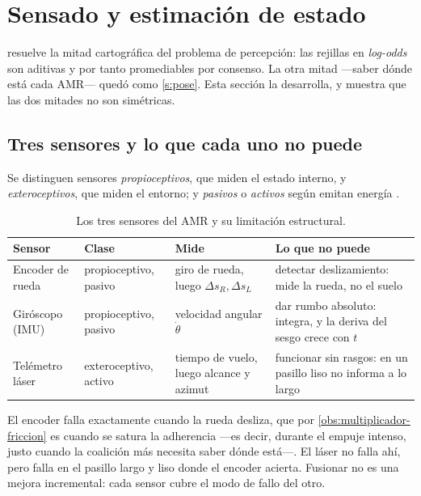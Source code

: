 \section{Sensado y estimación de estado}
\label{sec:estimacion}

 resuelve la mitad cartográfica del problema de percepción: las
rejillas en \emph{log-odds} son aditivas y por tanto promediables por consenso.
La otra mitad —saber dónde está cada AMR— quedó como \cref{s:pose}. Esta sección
la desarrolla, y muestra que las dos mitades no son simétricas.

\subsection{Tres sensores y lo que cada uno no puede}

Se distinguen sensores \emph{propioceptivos}, que miden el estado interno, y
\emph{exteroceptivos}, que miden el entorno; y \emph{pasivos} o \emph{activos}
según emitan energía \cite{siegwart2011introduction}.

\begin{table}[!ht]
\centering\small
\caption{Los tres sensores del AMR y su limitación estructural.}
\label{tab:sensores}
\begin{tabularx}{\textwidth}{@{}p{2.7cm}p{2.4cm}p{3.0cm}X@{}}
\toprule
Sensor & Clase & Mide & Lo que no puede \\
\midrule
Encoder de rueda & propioceptivo, pasivo & giro de rueda, luego
  $\Delta s_R,\Delta s_L$ & detectar deslizamiento: mide la rueda, no el suelo \\
Giróscopo (IMU) & propioceptivo, pasivo & velocidad angular $\dot\theta$
  & dar rumbo absoluto: integra, y la deriva del sesgo crece con $t$ \\
Telémetro láser & exteroceptivo, activo & tiempo de vuelo, luego
  alcance y azimut & funcionar sin rasgos: en un pasillo liso no informa a lo
  largo \\
\bottomrule
\end{tabularx}
\end{table}

\begin{observacion}
\label{obs:complementarios}
El encoder falla exactamente cuando la rueda desliza, que por
\cref{obs:multiplicador-friccion} es cuando se satura la adherencia —es decir,
durante el empuje intenso, justo cuando la coalición más necesita saber dónde
está—. El láser no falla ahí, pero falla en el pasillo largo y liso donde el
encoder acierta. Fusionar no es una mejora incremental: cada sensor cubre el
modo de fallo del otro.
\end{observacion}

